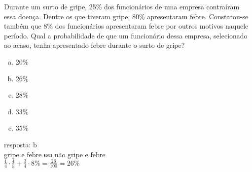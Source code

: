\begin{ex}
Durante um surto de gripe, 25\% dos funcionários de uma empresa contraíram essa doença. Dentre os que tiveram gripe, 80\% apresentaram febre. Constatou-se também que 8\% dos funcionários apresentaram febre por outros motivos naquele período. Qual a probabilidade de que um funcionário dessa empresa, selecionado ao acaso, tenha apresentado febre durante o surto de gripe?
   \begin{enumerate}[(a)]
   \item 20\%
   \item 26\%
   \item 28\%
   \item 33\%
   \item 35\%
   \end{enumerate}
     \begin{sol}
         resposta: b  \\
         gripe e febre \textbf{ou} não gripe e febre \\
         $\frac{1}{4}\cdot\frac{4}{5}+\frac{3}{4}\cdot8\%= \frac{26}{100}=26\%$
     \end{sol}
\end{ex}